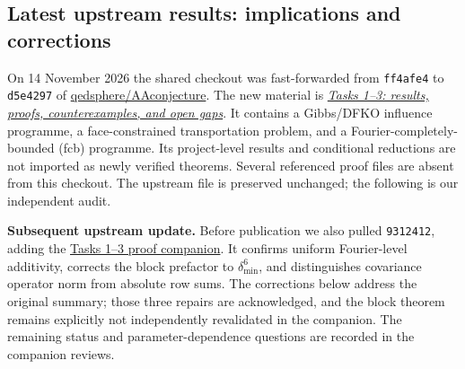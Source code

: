 \subsection{Latest upstream results: implications and corrections}
\label{tht:upstream}

On 14 November 2026 the shared checkout was fast-forwarded from
\texttt{ff4afe4} to \texttt{d5e4297} of
\href{https://github.com/qedsphere/AAconjecture}{qedsphere/AAconjecture}.
The new material is
\href{https://github.com/qedsphere/AAconjecture/blob/d5e429763b9f0234f5dd02c3fe03925c78b4306c/tasks-1-2-3-summary.md}
{\emph{Tasks 1--3: results, proofs, counterexamples, and open gaps}}.
It contains a Gibbs/DFKO influence programme, a face-constrained
transportation problem, and a Fourier-completely-bounded (fcb) programme.
Its project-level results and conditional reductions are not imported
as newly verified theorems. Several referenced proof files are absent
from this checkout. The upstream file is preserved unchanged; the
following is our independent audit.

\textbf{Subsequent upstream update.} Before publication we also pulled
\texttt{9312412}, adding the
\href{https://github.com/qedsphere/AAconjecture/blob/9312412/tasks-1-2-3-proof-companion.md}
{Tasks 1--3 proof companion}. It confirms uniform Fourier-level
additivity, corrects the block prefactor to $\delta_{\min}^{6}$, and
distinguishes covariance operator norm from absolute row sums. The
corrections below address the original summary; those three repairs
are acknowledged, and the block theorem remains explicitly not
independently revalidated in the companion. The remaining status and
parameter-dependence questions are recorded in the companion reviews.






